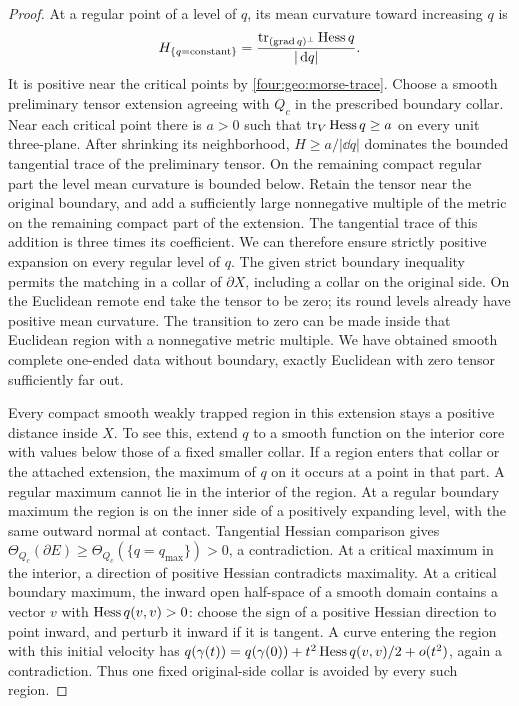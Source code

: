 \begin{proof}
At a regular point of a level of $q$, its mean curvature toward increasing
$q$ is
\[
 H_{\{q=\text{constant}\}}
 =\frac{\operatorname{tr}_{(\operatorname{grad} q)^\perp}\operatorname{Hess} q}{|\,\mathrm d q|}.
\]
It is positive near the critical points by \eqref{four:geo:morse-trace}.
Choose a smooth preliminary tensor extension agreeing with $Q_c$ in the
prescribed boundary collar. Near each critical point there is $a>0$ such
that $\operatorname{tr}_V\operatorname{Hess} q\ge a$ on every unit three-plane. After shrinking its
neighborhood, $H\ge a/|\dd q|$ dominates the bounded tangential trace of
the preliminary tensor. On the remaining compact regular part the level
mean curvature is bounded below. Retain the tensor near the original
boundary, and add a sufficiently large nonnegative multiple of the metric
on the remaining compact part of the extension.  The tangential trace of this addition is three times its
coefficient.  We can therefore ensure strictly positive expansion on every
regular level of $q$.  The given strict boundary inequality permits the
matching in a collar of $\partial X$, including a collar on the original
side.  On the Euclidean remote end take the tensor to be zero; its round
levels already have positive mean curvature.  The transition to zero can
be made inside that Euclidean region with a nonnegative metric multiple.
We have obtained smooth complete one-ended data without boundary, exactly
Euclidean with zero tensor sufficiently far out.

Every compact smooth weakly trapped region in this extension stays a
positive distance inside $X$.  To see this, extend $q$ to a smooth function
on the interior core with values below those of a fixed smaller collar.
If a region enters that collar or the attached extension, the maximum of
$q$ on it occurs at a point in that part.  A regular maximum cannot lie in
the interior of the region.  At a regular boundary maximum the region is
on the inner side of a positively expanding level, with the same outward
normal at contact.  Tangential Hessian comparison gives
$\Theta_{Q_c}(\partial E)\ge\Theta_{Q_c}(\{q=q_{\max}\})>0$, a
contradiction.  At a critical maximum in the interior, a direction of
positive Hessian contradicts maximality.  At a critical boundary maximum,
the inward open half-space of a smooth domain contains a vector $v$ with
$\operatorname{Hess} q(v,v)>0$: choose the sign of a positive Hessian direction to point
inward, and perturb it inward if it is tangent.  A curve entering the region
with this initial velocity has
$q(\gamma(t))=q(\gamma(0))+t^2\operatorname{Hess} q(v,v)/2+o(t^2)$, again a
contradiction.  Thus one fixed original-side collar is avoided by every
such region.


\end{proof}
